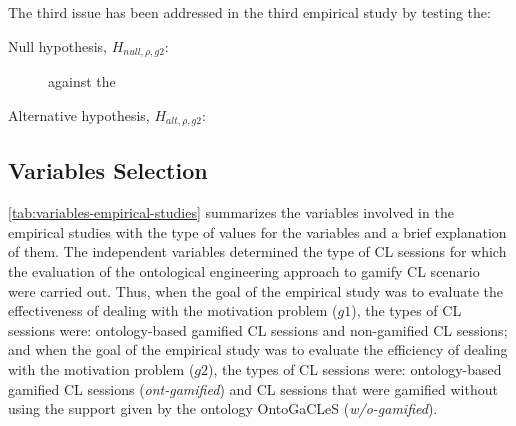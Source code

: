 The third issue  has been addressed in the third empirical study by testing the:

\begin{description}
\item[Null hypothesis, $H_{null,\rho,g2}$:]  against the
\item[Alternative hypothesis, $H_{alt,\rho,g2}$:] 
\end{description}


\subsection{Variables Selection}

\autoref{tab:variables-empirical-studies} summarizes the variables involved in the empirical studies with the type of values for the variables and a brief explanation of them. The independent variables  determined the type of CL sessions for which the evaluation of the ontological engineering approach to gamify CL scenario were carried out. Thus, when the goal of the empirical study was to evaluate the effectiveness of dealing with the motivation problem ($g1$), the types of CL sessions were: ontology-based gamified CL sessions and non-gamified CL sessions; and when the goal of the empirical study was to evaluate the efficiency of dealing with the motivation problem ($g2$), the types of CL sessions were: ontology-based gamified CL sessions (\emph{ont-gamified}) and CL sessions that were gamified without using the support given by the ontology OntoGaCLeS (\emph{w/o-gamified}).

